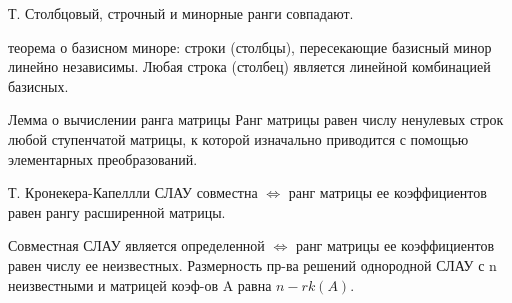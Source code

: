 \documentclass{article}
\begin{document}
Т. Столбцовый, строчный и минорные ранги совпадают.

\textsf{теорема о базисном миноре:} строки (столбцы), пересекающие базисный минор линейно независимы. Любая строка (столбец) является линейной комбинацией базисных.

\textsf{Лемма о вычислении ранга матрицы}
Ранг матрицы равен числу ненулевых строк любой ступенчатой матрицы, к которой изначально приводится с помощью элементарных преобразований.

\textsf{Т. Кронекера-Капеллли} СЛАУ совместна $\Leftrightarrow$ ранг матрицы ее коэффициентов равен рангу расширенной матрицы.

Совместная СЛАУ является определенной $\Leftrightarrow$ ранг матрицы ее коэффициентов равен числу ее неизвестных. Размерность пр-ва решений однородной СЛАУ с n неизвестными и матрицей коэф-ов A равна $n-rk(A)$.
\end{document}
